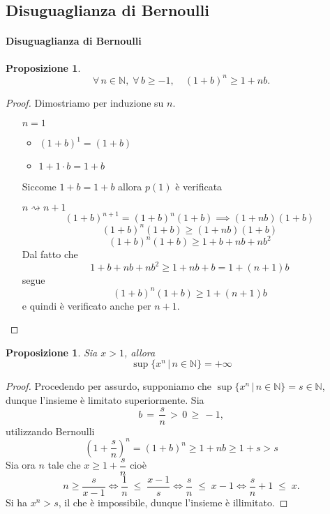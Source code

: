 \documentclass{article}
\theoremstyle{plain}
\newtheorem{prop}[thm]{Proposizione}
\theoremstyle{definition}
\theoremstyle{remark}
\begin{document}
\vspace{10pt}

\subsection{Disuguaglianza di Bernoulli}

\vspace{10pt}

\paragraph{Disuguaglianza di Bernoulli}
\begin{bxthm}
\begin{prop}
    \[ \forall\, n\in\mathbb{N}, \; \forall\, b\geq -1, \quad (1+b)^n\geq 1+nb.\]
\end{prop}
\end{bxthm}
\begin{proof}
    Dimostriamo per induzione su $n$.
    \begin{itemize}
        \item[$n=1$]
        \begin{itemize}
            \item $(1+b)^1=(1+b)$
            \item $1+1\cdot b=1+b$
        \end{itemize}
        Siccome $1+b=1+b$ allora $p(1)$ è verificata
        \item[$n\rightsquigarrow n+1$]
        \[(1+b)^{n+1}=(1+b)^n(1+b)\implies(1+nb)(1+b)\]
        \[(1+b)^n(1+b)\geq (1+nb)(1+b)\]
        \[(1+b)^n(1+b)\geq 1+b+nb+nb^2\]
        Dal fatto che
        \[1+b+nb+nb^2 \geq 1+nb+b = 1+(n+1)b\]
        segue
        \[(1+b)^n(1+b)\geq 1+(n+1)b\] e quindi è verificato anche per $n+1$.
    \end{itemize}
\end{proof}

\vspace{10pt}

\begin{bxthm}
\begin{prop}
    Sia $x>1$, allora 
    \[\sup\{x^n\,|\,n\in\mathbb{N}\}=+\infty\]
\end{prop}
\end{bxthm}
\begin{proof}
    Procedendo per assurdo, supponiamo che $\sup\{x^n\,|\,n\in\mathbb{N}\}=s\in\mathbb{N}$, dunque l'insieme è limitato superiormente.
    Sia \[b\,=\,\dfrac{s}{n}\,>\,0\,\geq\, -1,\]
    utilizzando Bernoulli
    \[\left(1+\frac{s}{n}\right)^n=(1+b)^n\geq 1+nb\geq 1+s>s\]
    Sia ora $n$ tale che $x\geq 1+\dfrac{s}{n}$
    cioè 
    \[ n\geq\frac{s}{x-1}\iff \frac{1}{n}\;\leq\;\frac{x-1}{s}\iff\frac{s}{n}\;\leq\; x-1\iff\frac{s}{n}+1\;\leq\; x. \]
    Si ha $x^n>s$, il che è impossibile, dunque l'insieme è illimitato.
\end{proof}
\end{document}
